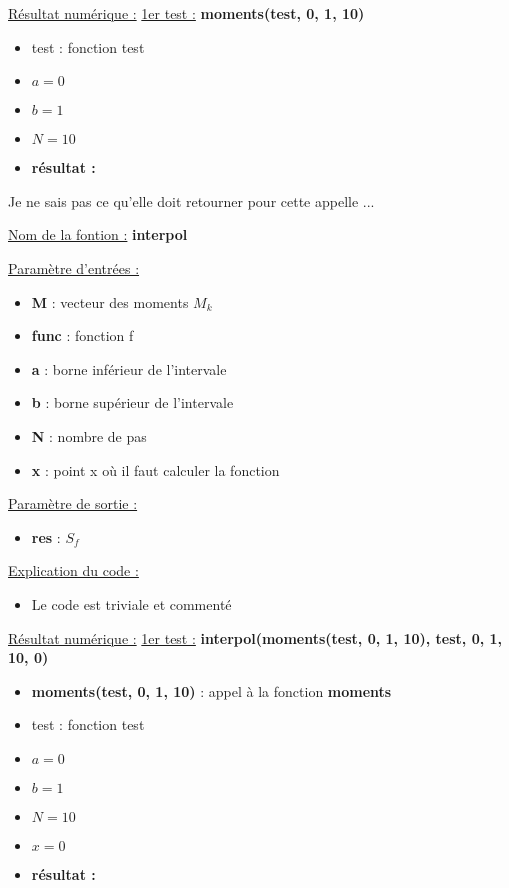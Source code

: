 \documentclass[12pt, letterpaper]{article}
\begin{document}
\begin{enumerate}
    \underline{Résultat numérique :} \newline
    \underline{1er test :} \textbf{moments(test, 0, 1, 10)}

    \begin{itemize}
    \item test : fonction test
    \item $ a = 0 $
    \item $ b = 1 $
    \item $ N = 10 $
    \item \textbf{résultat :} 
    \end{itemize}

    Je ne sais pas ce qu'elle doit retourner pour cette appelle ...
  
    \underline{Nom de la fontion :} \textbf{interpol} \newline
    
    \underline{Paramètre d'entrées :}
    \begin{itemize}
    \item \textbf{M} : vecteur des moments $M_k$
    \item \textbf{func} : fonction f
    \item \textbf{a} : borne inférieur de l'intervale
    \item \textbf{b} : borne supérieur de l'intervale
    \item \textbf{N} : nombre de pas
    \item \textbf{x} : point x où il faut calculer la fonction
    \end{itemize}

    \underline{Paramètre de sortie :}
    \begin{itemize}
    \item \textbf{res} : $S_f$
    \end{itemize}

    \underline{Explication du code :} \newline
    
    \begin{itemize}
    \item Le code est triviale et commenté
    \end{itemize}

    \underline{Résultat numérique :} \newline
    \underline{1er test :} \textbf{interpol(moments(test, 0, 1, 10), test,
      0, 1, 10, 0)}

    \begin{itemize}
    \item \textbf{moments(test, 0, 1, 10)} : appel à la fonction \textbf{moments}
    \item test : fonction test
    \item $ a = 0 $
    \item $ b = 1 $
    \item $ N = 10 $
    \item $x = 0$
    \item \textbf{résultat :} 
    \end{itemize}


\end{enumerate}
\end{document}

